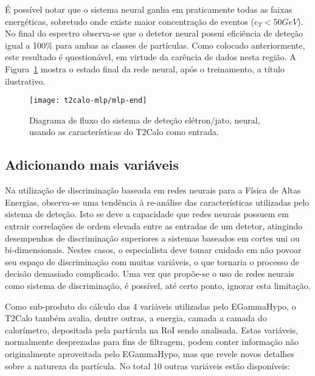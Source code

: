 É possível notar que o sistema neural ganha em praticamente todas as faixas
energéticas, sobretudo onde existe maior concentração de eventos ($e_T<50
GeV$). No final do espectro observa-se que o detetor neural possui eficiência
de deteção igual a 100\% para ambas as classes de partículas. Como colocado
anteriormente, este resultado é questionável, em virtude da carência de dados
nesta região. A Figura~\ref{fig:t2calo-mlp-best-net} mostra o estado final da
rede neural, após o treinamento, a título ilustrativo.

\begin{figure}
\begin{center}
\begin{sideways}
\texttt{[image: t2calo-mlp/mlp-end]}
\end{sideways}
\end{center}
\caption{Diagrama de fluxo do sistema de deteção elétron/jato, neural, usando as
características do T2Calo como entrada.}
\label{fig:t2calo-mlp-best-net}
\end{figure}

\subsection{Adicionando mais variáveis}

Na utilização de discriminação baseada em redes neurais para a Física de Altas
Energias, observa-se uma tendência à re-análise das características utilizadas
pelo sistema de deteção. Isto se deve a capacidade que redes neurais possuem
em extrair correlações de ordem elevada entre as entradas de um detetor,
atingindo desempenhos de discriminação superiores a sistemas baseados em
cortes uni ou bi-dimensionais. Nestes casos, o especialista deve tomar cuidado
em não povoar seu espaço de discriminação com muitas variáveis, o que
tornaria o processo de decisão demasiado complicado. Uma vez que propõe-se o
uso de redes neurais como sistema de discriminação, é possível, até certo
ponto, ignorar esta limitação.

Como sub-produto do cálculo das 4 variáveis utilizadas pelo EGammaHypo, o
T2Calo também avalia, dentre outras, a energia, camada a camada do
calorímetro, depositada pela partícula na RoI sendo analisada. Estas
variáveis, normalmente desprezadas para fins de filtragem, podem conter
informação não originalmente aproveitada pelo EGammaHypo, mas que revele
novos detalhes sobre a natureza da partícula. No total 10 outras variáveis
estão disponíveis:

